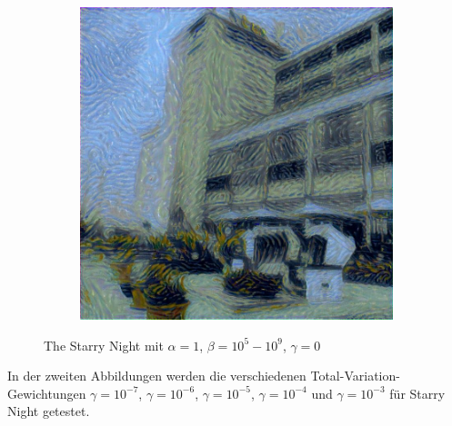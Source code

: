 \begin{figure}[H]
\begin{subfigure}[h]{0.15\textwidth}
    \end{subfigure}
    \begin{subfigure}[h]{0.15\textwidth}
        \centering
        \includegraphics[width=\textwidth]{resources/content/experiments/a__starry_night__768x768__style-weight_1e+09__tv-weight_0e+00.jpg}
    \end{subfigure}
    \caption{The Starry Night mit $ \alpha = 1 $, $ \beta = 10^{5} - 10^{9} $, $ \gamma = 0 $}
\end{figure}

In der zweiten Abbildungen werden die verschiedenen Total-Variation-Gewichtungen $ \gamma = 10^{-7} $, $ \gamma = 10^{-6} $, $ \gamma = 10^{-5} $, $ \gamma = 10^{-4} $ und $ \gamma = 10^{-3} $  für Starry Night getestet.

